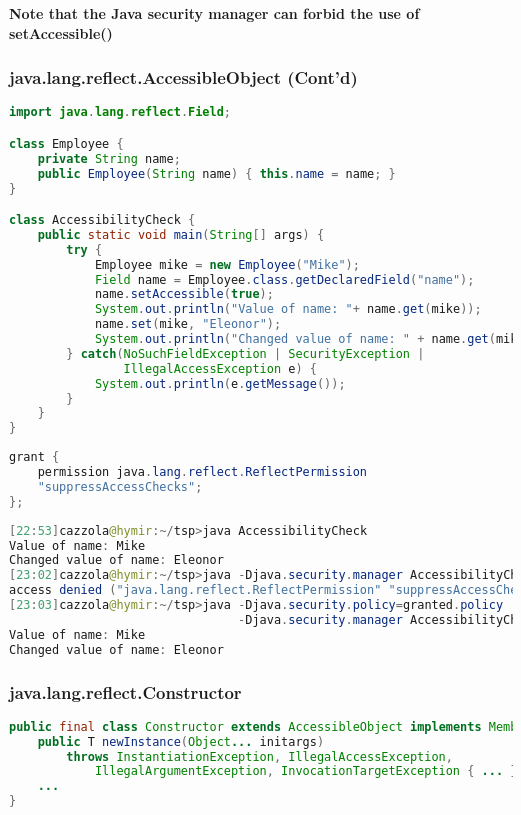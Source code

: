 \textbf{Note that the Java security manager can forbid the use of setAccessible()}

\subsubsection{java.lang.reflect.AccessibleObject (Cont'd)}

\begin{lstlisting}[language=Java]
import java.lang.reflect.Field;

class Employee {
	private String name;
	public Employee(String name) { this.name = name; }
}

class AccessibilityCheck {
	public static void main(String[] args) {
		try {
			Employee mike = new Employee("Mike");
			Field name = Employee.class.getDeclaredField("name");
			name.setAccessible(true);
			System.out.println("Value of name: "+ name.get(mike));
			name.set(mike, "Eleonor");
			System.out.println("Changed value of name: " + name.get(mike));
		} catch(NoSuchFieldException | SecurityException |
				IllegalAccessException e) {
			System.out.println(e.getMessage());
		}
	}
}
\end{lstlisting}

\begin{lstlisting}[language=Java]
grant {
	permission java.lang.reflect.ReflectPermission
	"suppressAccessChecks";
};
\end{lstlisting}

\begin{lstlisting}[language=Java]
[22:53]cazzola@hymir:~/tsp>java AccessibilityCheck
Value of name: Mike
Changed value of name: Eleonor
[23:02]cazzola@hymir:~/tsp>java -Djava.security.manager AccessibilityCheck
access denied ("java.lang.reflect.ReflectPermission" "suppressAccessChecks")
[23:03]cazzola@hymir:~/tsp>java -Djava.security.policy=granted.policy
                                -Djava.security.manager AccessibilityCheck
Value of name: Mike
Changed value of name: Eleonor
\end{lstlisting}

\subsubsection{java.lang.reflect.Constructor}

\begin{lstlisting}[language=Java]
public final class Constructor extends AccessibleObject implements Member {
	public T newInstance(Object... initargs)
		throws InstantiationException, IllegalAccessException,
			IllegalArgumentException, InvocationTargetException { ... }
	...
}
\end{lstlisting}

